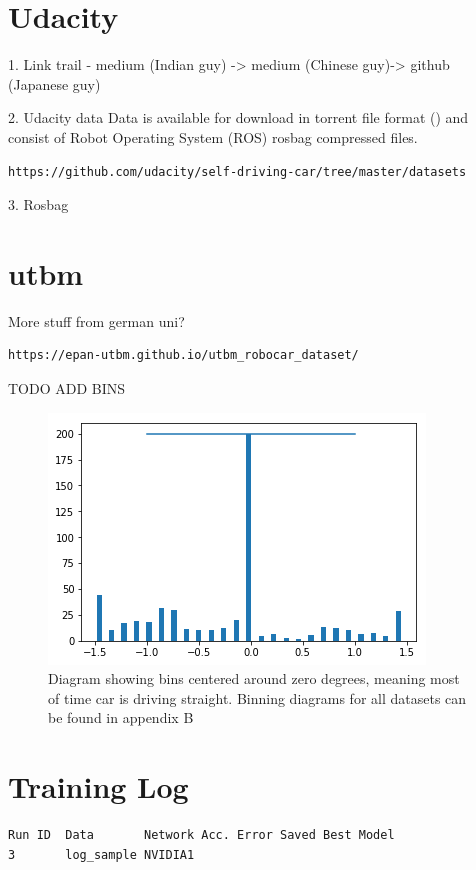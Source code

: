 
\section{Udacity}

1. Link trail - medium (Indian guy) -> medium (Chinese guy)-> github (Japanese guy)  
  
2. Udacity data  
Data is available for download in torrent file format (\cite{torrentCite}) and consist of Robot Operating System (ROS) rosbag compressed files.

\begin{verbatim}
https://github.com/udacity/self-driving-car/tree/master/datasets
\end{verbatim}
3. Rosbag

\section{utbm}
More stuff from german uni?
\begin{verbatim}
https://epan-utbm.github.io/utbm_robocar_dataset/
\end{verbatim}

TODO ADD BINS
\begin{figure}[ht]
 \centering 
 \includegraphics[scale=1]{Figures/bins.png}
 \caption{Diagram showing bins centered around zero degrees, meaning most of time car is driving straight. Binning diagrams for all datasets can be found in appendix B}
 \label{fig:bins-placeholder}
\end{figure}

\section{Training Log}

\begin{verbatim}
Run ID  Data       Network Acc. Error Saved Best Model 
3       log_sample NVIDIA1
\end{verbatim}

